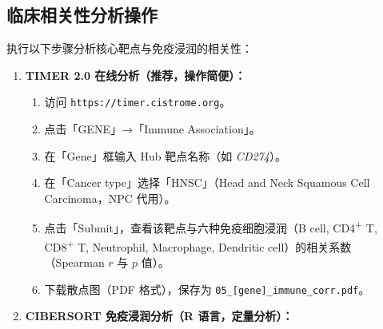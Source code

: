 \documentclass[12pt,a4paper,twoside]{article}
\newcommand{\gene}[1]{\textit{#1}}
\begin{document}
\subsection{临床相关性分析操作}
\label{sec:module5_clinical}

执行以下步骤分析核心靶点与免疫浸润的相关性：

\begin{enumerate}
  \item \textbf{TIMER 2.0 在线分析（推荐，操作简便）：}
    \begin{enumerate}
      \item 访问 \texttt{https://timer.cistrome.org}。
      \item 点击「GENE」→「Immune Association」。
      \item 在「Gene」框输入 Hub 靶点名称（如 \gene{CD274}）。
      \item 在「Cancer type」选择「HNSC」（Head and Neck Squamous Cell Carcinoma，NPC 代用）。
      \item 点击「Submit」，查看该靶点与六种免疫细胞浸润（B cell, CD4\textsuperscript{+} T, CD8\textsuperscript{+} T, Neutrophil, Macrophage, Dendritic cell）的相关系数（Spearman $r$ 与 $p$ 值）。
      \item 下载散点图（PDF 格式），保存为 \texttt{05\_[gene]\_immune\_corr.pdf}。
    \end{enumerate}

  \item \textbf{CIBERSORT 免疫浸润分析（R 语言，定量分析）：}
\end{enumerate}
\end{document}
